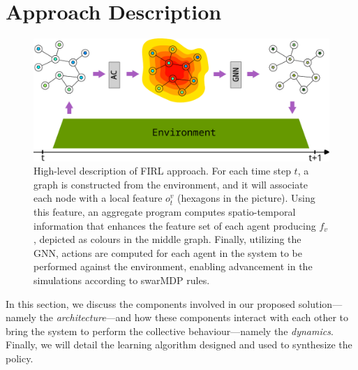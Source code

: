 \section{Approach Description}
\label{acsos2023:sec:approach}
\begin{figure}
	\centering
  \includegraphics[width=.8\linewidth]{papers/acsos2023/imgs/architecture.pdf}

  \caption[High-level description of \ac{FIRL} approach.]{ High-level description of \ac{FIRL} approach. 
  For each time step $t$, a graph is constructed from the environment, and it will associate each node with a local feature $o^v_t$ (hexagons in the picture). 
  Using this feature, an aggregate program computes spatio-temporal information that enhances the feature set of each agent producing $f_v$, depicted as colours in the middle graph. 
  Finally, utilizing the GNN, actions are computed for each agent in the system to be performed against the environment, enabling advancement in the simulations according to swarMDP rules.
}  \label{acsos2023:fig:architecture}
\end{figure}
In this section, we discuss the components involved in our proposed solution---namely the \emph{architecture}---and how these components interact with each other to bring the system to perform the collective behaviour---namely the \emph{dynamics}. 
 Finally, we will detail the learning algorithm designed and used to synthesize the policy.
